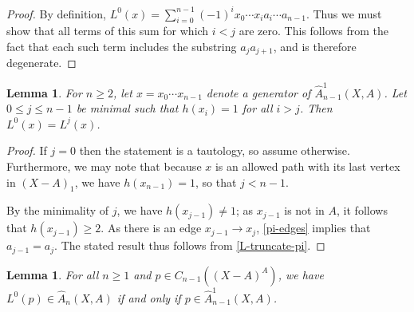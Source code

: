 \documentclass[11pt]{article}
\newtheorem{lemma}[theo]{Lemma}
\theoremstyle{definition}
\numberwithin{equation}{section}
\newcommand{\W}{(X - A)_1}
\newcommand{\tA}{\widehat{A}}
\newcommand{\tAOne}{\widehat{A}^1}
\begin{document}
\begin{proof}
By definition, $L^0(x) = \sum\limits_{i = 0}^{n-1} (-1)^i x_0 \cdots x_i a_i \cdots a_{n-1}$. Thus we must show that all terms of this sum for which $i < j$ are zero. This follows from the fact that each such term includes the substring $a_j a_{j+1}$, and is therefore degenerate.
\end{proof}

\begin{lemma}\label{L-truncate-minimal}
For $n \geq 2$, let $x = x_0 \cdots x_{n-1}$ denote a generator of $\tAOne_{n-1}(X,A)$. Let $0 \leq j \leq n-1$ be minimal such that $h(x_i) = 1$ for all $i > j$. Then $L^0(x) = L^j(x)$.
\end{lemma}

\begin{proof}
If $j = 0$ then the statement is a tautology, so assume otherwise.  Furthermore, we may note that because $x$ is an allowed path with its last vertex in $\W$, we have $h(x_{n-1}) = 1$, so that $j < n - 1$.

By the minimality of $j$, we have $h(x_{j-1}) \neq 1$; as $x_{j-1}$ is not in $A$, it follows that $h(x_{j-1}) \geq 2$. As there is an edge $x_{j-1} \to x_j$, \cref{pi-edges} implies that $a_{j-1} = a_j$. The stated result thus follows from \cref{L-truncate-pi}.
\end{proof}

\begin{lemma}\label{L-allowed}
For all $n \geq 1$ and $p \in C_{n-1}((X-A)^A)$, we have $L^0(p) \in \tA_{n}(X,A)$ if and only if $p \in \tAOne_{n-1}(X,A)$.
\end{lemma}
\end{document}

